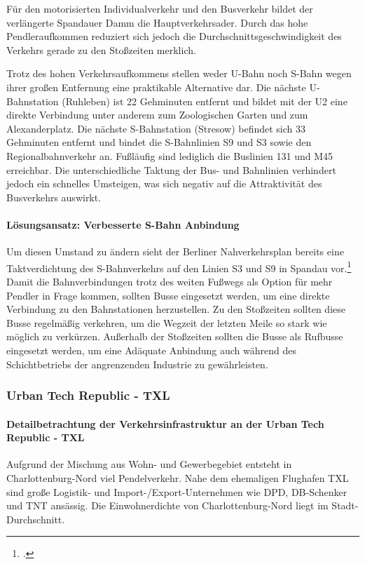 
Für den motorisierten Individualverkehr und den Busverkehr bildet der verlängerte Spandauer Damm die Hauptverkehrsader. Durch das hohe Pendleraufkommen reduziert sich jedoch die Durchschnittsgeschwindigkeit des Verkehrs gerade zu den Stoßzeiten merklich.

Trotz des hohen Verkehrsaufkommens stellen weder U-Bahn noch S-Bahn wegen ihrer großen Entfernung eine praktikable Alternative dar. Die nächste U-Bahnstation (Ruhleben) ist 22 Gehminuten entfernt und bildet mit der U2 eine direkte Verbindung unter anderem zum Zoologischen Garten und zum Alexanderplatz. Die nächste S-Bahnstation (Stresow) befindet sich 33 Gehminuten entfernt und bindet die S-Bahnlinien S9 und S3 sowie den Regionalbahnverkehr an. Fußläufig sind lediglich die Buslinien 131 und M45 erreichbar. Die unterschiedliche Taktung der Bus- und Bahnlinien verhindert jedoch ein schnelles Umsteigen, was sich negativ auf die Attraktivität des Busverkehrs auswirkt.

\paragraph{Lösungsansatz: Verbesserte S-Bahn Anbindung}
Um diesen Umstand zu ändern sieht der Berliner Nahverkehrsplan bereits eine Taktverdichtung des S-Bahnverkehrs auf den Linien S3 und S9 in Spandau vor.\footcite{NahverkehrsplanBerlin} Damit die Bahnverbindungen trotz des weiten Fußwegs als Option für mehr Pendler in Frage kommen, sollten Busse eingesetzt werden, um eine direkte Verbindung zu den Bahnstationen herzustellen. Zu den Stoßzeiten sollten diese Busse regelmäßig verkehren, um die Wegzeit der letzten Meile so stark wie möglich zu verkürzen. Außerhalb der Stoßzeiten sollten die Busse als Rufbusse eingesetzt werden, um eine Adäquate Anbindung auch während des Schichtbetriebs der angrenzenden Industrie zu gewährleisten.

\subsubsection{Urban Tech Republic - TXL}
\paragraph{Detailbetrachtung der Verkehrsinfrastruktur an der Urban Tech Republic - TXL}
Aufgrund der Mischung aus Wohn- und Gewerbegebiet entsteht in Charlottenburg-Nord viel Pendelverkehr. Nahe dem ehemaligen Flughafen TXL sind große Logistik- und Import-/Export-Unternehmen wie DPD, DB-Schenker und TNT ansässig. Die Einwohnerdichte von Charlottenburg-Nord liegt im Stadt-Durchschnitt.

